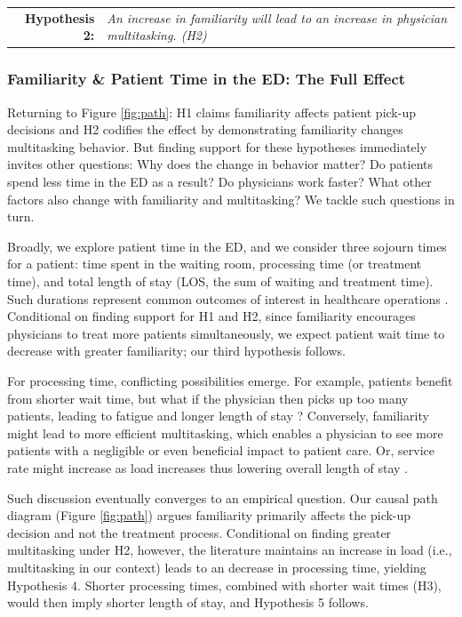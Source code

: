  \medskip \noindent
 \begin{tabularx}{\linewidth}{ r X }
    \textbf{Hypothesis 2:} & \textit{An increase in familiarity will lead to an increase in physician multitasking. (H2)}
 \end{tabularx}   %

 \subsubsection{Familiarity \& Patient Time in the ED: The Full Effect}
 Returning to Figure \ref{fig:path}: H1 claims familiarity affects patient pick-up decisions and H2 codifies the effect by demonstrating familiarity changes multitasking behavior. But finding support for these hypotheses immediately invites other questions: Why does the change in behavior matter? Do patients spend less time in the ED as a result? Do physicians work faster? What other factors also change with familiarity and multitasking? We tackle such questions in turn.
 
 Broadly, we explore patient time in the ED, and we consider three sojourn times for a patient: time spent in the waiting room, processing time (or treatment time), and total length of stay (LOS, the sum of waiting and treatment time). Such durations represent common outcomes of interest in healthcare operations \citep[e.g.,][]{KC2009,Song2015,BerryJaeker2017,Batt2017,KC2020_tcp}. Conditional on finding support for H1 and H2, since familiarity encourages physicians to treat more patients simultaneously, we expect patient wait time to decrease with greater familiarity; our third hypothesis follows.  
 
 For processing time, conflicting possibilities emerge. For example, patients benefit from shorter wait time, but what if the physician then picks up too many patients, leading to fatigue and longer length of stay \citep{KC2009,Gans2010,StaatsGino2012}? Conversely, familiarity might lead to more efficient multitasking, which enables a physician to see more patients with a negligible \citep{Maestad2010} or even beneficial \citep{KC2014} impact to patient care. Or, service rate might increase as load increases \citep{Schultz1998} thus lowering overall length of stay \citep{Deo2019}. 
 
 Such discussion eventually converges to an empirical question. Our causal path diagram (Figure \ref{fig:path}) argues familiarity primarily affects the pick-up decision and not the treatment process. Conditional on finding greater multitasking under H2, however, the literature \citep[see][]{Delasay2018} maintains an increase in load (i.e., multitasking in our context) leads to an decrease in processing time, yielding Hypothesis 4. Shorter processing times, combined with shorter wait times (H3), would then imply shorter length of stay, and Hypothesis 5 follows.
 
